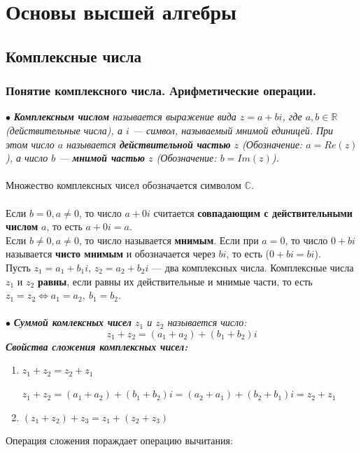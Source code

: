 \part{Основы высшей алгебры}
\chapter{Комплексные числа}
\section{Понятие комплексного числа. Арифметические операции.}
$\bullet$ \textit{\textbf{Комплексным числом} называется выражение вида $z = a+bi$, где $a, b \in \mathbb{R}$ (действительные
	числа), а $i$ --- символ, называемый мнимой единицей. При этом число $a$ называется \textbf{действительной частью} $z$ (Обозначение: $a = Re(z)$), а число $b$ --- \textbf{мнимой частью} $z$ (Обозначение: $b = Im(z)$).}\\\\
Множество комплексных чисел обозначается символом $\mathbb{C}$.\\\\
Если $b=0, a\ne 0$, то число $a + 0i$ считается \textbf{совпадающим с действительными числом} $a$, то есть $a + 0i = a$.\\
Если $b\ne 0, a\ne 0$, то число называется \textbf{мнимым}. Если при $a = 0$, то число $0+bi$ называется \textbf{чисто мнимым} и обозначается через $bi$, то есть ($0+bi = bi$).\\
Пусть $z_1 = a_1 + b_1 i$, $z_2 = a_2 + b_2 i$ --- два комплексных числа. Комплексные числа $z_1$ и $z_2$ \textbf{равны}, если равны их действительные и мнимые части, то есть $z_1 = z_2 \Longleftrightarrow a_1 = a_2,\ b_1 = b_2$.\\\\
$\bullet$ \textit{\textbf{Суммой комлексных чисел} $z_1$ и $z_2$ называется число: $$z_1 + z_2 = (a_1 + a_2) + (b_1 + b_2) i$$}
\textbf{\textit{Свойства сложения комплексных чисел:}}\begin{enumerate}
	\item $z_1 + z_2 = z_2 + z_1$ \begin{Proof}
		$z_1 + z_2 = (a_1 + a_2) + (b_1 + b_2) i = (a_2 + a_1) + (b_2 + b_1) i = z_2 + z_1$
	\end{Proof}
	\item $(z_1 + z_2) + z_3 = z_1 + (z_2 + z_3)$
\end{enumerate}
Операция сложения пораждает операцию вычитания:\\\\

